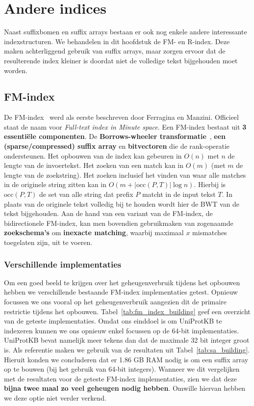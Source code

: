\chapter{Andere indices}\label{ch:andere-indices}
Naast suffixbomen en suffix arrays bestaan er ook nog enkele andere interessante indexstructuren.
We behandelen in dit hoofdstuk de FM- en R-index.
Deze maken achterliggend gebruik van suffix arrays, maar zorgen ervoor dat de resulterende index kleiner is doordat niet de volledige tekst bijgehouden moet worden.


\section{FM-index}\label{sec:fm-index}
De FM-index~\cite{fm_index} werd als eerste beschreven door Ferragina en Manzini.
Officieel staat de naam voor \textit{Full-text index in Minute space}.
Een FM-index bestaat uit \textbf{3 essentiële componenten}.
De \textbf{Borrows-wheeler transformatie}~\cite{bwt}, \textbf{een (sparse/compressed) suffix array} en \textbf{bitvectoren} die de rank-operatie ondersteunen.
Het opbouwen van de index kan gebeuren in $O(n)$ met $n$ de lengte van de invoertekst.
Het zoeken van een match kan in $O(m)$ (met $m$ de lengte van de zoekstring).
Het zoeken inclusief het vinden van waar alle matches in de originele string zitten kan in $O(m + \text{|occ}(P, T)\text{|} \log n)$.
Hierbij is $\text{occ}(P, T)$ de set van alle string dat prefix $P$ matcht in de input tekst $T$.
In plaats van de originele tekst volledig bij te houden wordt hier de BWT van de tekst bijgehouden.
Aan de hand van een variant van de FM-index, de bidirectionele FM-index, kan men bovendien gebruikmaken van zogenaamde \textbf{zoekschema's} om \textbf{inexacte matching}, waarbij maximaal $x$ mismatches toegelaten zijn, uit te voeren.

\subsection{Verschillende implementaties}\label{subsec:verschillende-implementaties}
Om een goed beeld te krijgen over het geheugenverbruik tijdens het opbouwen hebben we verschillende bestaande FM-index implementaties getest.
Opnieuw focussen we ons vooral op het geheugenverbruik aangezien dit de primaire restrictie tijdens het opbouwen.
Tabel~\ref{tab:fm_index_building} geef een overzicht van de geteste implementaties.
Omdat ons einddoel is om UniProtKB te indexeren kunnen we ons opnieuw enkel focussen op de 64-bit implementaties.
UniProtKB bevat namelijk meer tekens dan dat de maximale 32 bit integer groot is.
Als referentie maken we gebruik van de resultaten uit Tabel~\ref{tab:sa_building}.
Hieruit konden we concluderen dat er 1.86 GB RAM nodig is om een suffix array op te bouwen (bij het gebruik van 64-bit integers).
Wanneer we dit vergelijken met de resultaten voor de geteste FM-index implementaties, zien we dat deze \textbf{bijna twee maal zo veel geheugen nodig hebben}.
Omwille hiervan hebben we deze optie niet verder verkend.

